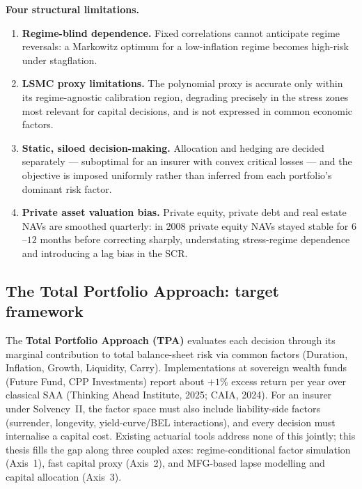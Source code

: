 \documentclass[11pt,a4paper]{article}
\begin{document}
\medskip
\noindent\textbf{Four structural limitations.}

\begin{enumerate}[leftmargin=1.8em,itemsep=2pt]
\item \textbf{Regime-blind dependence.}
Fixed correlations cannot anticipate regime reversals: a Markowitz optimum for
a low-inflation regime becomes high-risk under stagflation.

\item \textbf{LSMC proxy limitations.}
The polynomial proxy is accurate only within its regime-agnostic calibration
region, degrading precisely in the stress zones most relevant for capital
decisions, and is not expressed in common economic factors.

\item \textbf{Static, siloed decision-making.}
Allocation and hedging are decided separately --- suboptimal for an insurer with
convex critical losses --- and the objective is imposed uniformly rather than
inferred from each portfolio's dominant risk factor.

\item \textbf{Private asset valuation bias.}
Private equity, private debt and real estate NAVs are smoothed quarterly: in
2008 private equity NAVs stayed stable for $6$--$12$ months before correcting
sharply, understating stress-regime dependence and introducing a lag bias in
the SCR.
\end{enumerate}

\subsection{The Total Portfolio Approach: target framework}

The \textbf{Total Portfolio Approach (TPA)} evaluates each decision through its
marginal contribution to total balance-sheet risk via common factors
(Duration, Inflation, Growth, Liquidity, Carry). Implementations at sovereign
wealth funds (Future Fund, CPP Investments) report about $+1\%$ excess return
per year over classical SAA (Thinking Ahead Institute, 2025; CAIA, 2024). For
an insurer under Solvency~II, the factor space must also include liability-side
factors (surrender, longevity, yield-curve/BEL interactions), and every
decision must internalise a capital cost. Existing actuarial tools address none
of this jointly; this thesis fills the gap along three coupled axes:
regime-conditional factor simulation (Axis~1), fast capital proxy (Axis~2),
and MFG-based lapse modelling and capital allocation (Axis~3).
\end{document}
